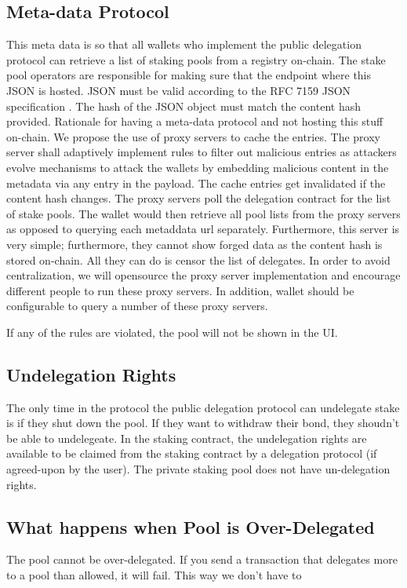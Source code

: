 \subsection{Meta-data Protocol}
This meta data is so that all wallets who implement the public delegation protocol can retrieve a list of staking pools from a registry on-chain. 
The stake pool operators are responsible for making sure that the endpoint where this JSON is hosted. JSON must be valid according to the RFC 7159 JSON specification \cite{rfc7159}. The hash of the JSON object must match the content hash provided. 
Rationale for having a meta-data protocol and not hosting this stuff on-chain. We propose the use of proxy servers to cache the entries. The proxy server shall adaptively implement rules to filter out malicious entries as attackers evolve mechanisms to attack the wallets by embedding malicious content in the metadata via any entry in the payload. The cache entries get invalidated if the content hash changes. The proxy servers poll the delegation contract for the list of stake pools. The wallet would then retrieve all pool lists from the proxy servers as opposed to querying each metaddata url separately. Furthermore, this server is very simple; furthermore, they cannot show forged data as the content hash is stored on-chain. All they can do is censor the list of delegates. In order to avoid centralization, we will opensource the proxy server implementation and encourage different people to run these proxy servers. In addition, wallet should be configurable to query a number of these proxy servers.

If any of the rules are violated, the pool will not be shown in the UI. 

\subsection{Undelegation Rights}
The only time in the protocol the public delegation protocol can undelegate stake is if they shut down the pool. If they want to withdraw their bond, they shoudn't be able to undelegeate. In the staking contract, the undelegation rights are available to be claimed from the staking contract by a delegation protocol (if agreed-upon by the user). The private staking pool does not have un-delegation rights. 



\subsection{What happens when Pool is Over-Delegated}
The pool cannot be over-delegated. If you send a transaction that delegates more to a pool than allowed, it will fail. This way we don't have to 

